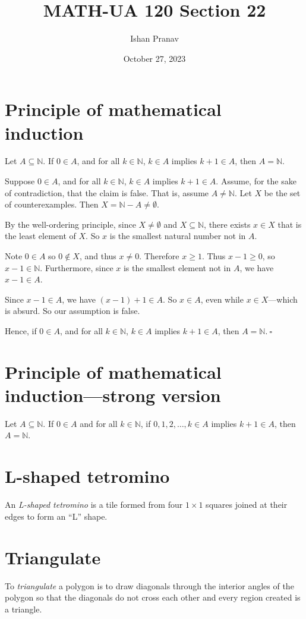 \documentclass[12pt]{article}
\title{MATH-UA 120 Section 22}
\author{Ishan Pranav}
\date{October 27, 2023}
\begin{document}
\maketitle
\section*{Principle of mathematical induction}
Let $A\subseteq\mathbb{N}$. If $0\in A$, and for all $k\in\mathbb{N}$, $k\in A$ implies $k+1\in A$, then $A=\mathbb{N}$.

Suppose $0\in A$, and for all $k\in\mathbb{N}$, $k\in A$ implies $k+1\in A$. Assume, for the sake of contradiction, that the claim is false. That is, assume $A\neq\mathbb{N}$. Let $X$ be the set of counterexamples. Then $X=\mathbb{N}-A\neq\emptyset$.

By the well-ordering principle, since $X\neq\emptyset$ and $X\subseteq\mathbb{N}$, there exists $x\in X$ that is the least element of $X$. So $x$ is the smallest natural number not in $A$.

Note $0\in A$ so $0\notin X$, and thus $x\neq 0$. Therefore $x\geq 1$. Thus $x-1\geq 0$, so $x-1\in\mathbb{N}$. Furthermore, since $x$ is the smallest element not in $A$, we have $x-1\in A$.

Since $x-1\in A$, we have $(x-1)+1\in A$. So $x\in A$, even while $x\in X$---which is absurd. So our assumption is false.

Hence, if $0\in A$, and for all $k\in\mathbb{N}$, $k\in A$ implies $k+1\in A$, then $A=\mathbb{N}.~\square$
\section*{Principle of mathematical induction---strong version}
Let $A\subseteq\mathbb{N}$. If $0\in A$ and for all $k\in\mathbb{N}$, if $0,1,2,\dots,k\in A$ implies $k+1\in A$, then $A=\mathbb{N}$.
\section*{L-shaped tetromino}
An \textit{L-shaped tetromino} is a tile formed from four $1\times 1$ squares joined at their edges to form an ``L'' shape.
\section*{Triangulate}
To \textit{triangulate} a polygon is to draw diagonals through the interior angles of the polygon so that the diagonals do not cross each other and every region created is a triangle.
\end{document}
